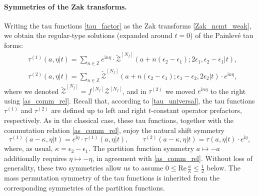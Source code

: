 \documentclass[12pt,a4paper]{article}
\numberwithin{equation}{section}
\newcommand{\ri}{\mathrm{i}}
\begin{document}
\paragraph{Symmetries of the Zak transforms.}
Writing the tau functions \eqref{tau_factor} as the Zak transforms \eqref{Zak_ncmt_weak},
we obtain the regular-type solutions (expanded around $t=0$) of the Painlev\'e tau forms: 
\begin{align}\label{Zak_tau1}
&\tau^{(1)}(a,\eta|t)=\sum_{n\in\mathbb{Z}}e^{\ri n \eta}\cdot\widetilde{\mathcal{Z}}^{[N_f]}(a+n(\epsilon_2{-}\epsilon_1);2\epsilon_1,\epsilon_2{-}\epsilon_1|t), \\ \label{Zak_tau2}
&\tau^{(2)}(a,\eta|t)=\sum_{n\in\mathbb{Z}}\widetilde{\mathcal{Z}}^{[N_f]}(a+n(\epsilon_2{-}\epsilon_1);\epsilon_1{-}\epsilon_2,2\epsilon_2|t)\cdot e^{\ri n \eta},
\end{align}
where we denoted $\widetilde{\mathcal{Z}}^{[N_f]}=f^{[N_f]}\mathcal{Z}^{[N_f]}$, and in $\tau^{(2)}$ we moved $e^{\ri n\eta}$ to the right using \eqref{as_comm_rel}. Recall that, according to \eqref{tau_universal}, the tau functions $\tau^{(1)}$ and $\tau^{(2)}$ are defined up to left and right $t$-constant operator prefactors, respectively. As in the classical case, these tau functions, together with the commutation relation \eqref{as_comm_rel}, enjoy the natural shift symmetry
\begin{equation}\label{weak_shift}
\tau^{(1)}(a-\kappa,\eta|t)=e^{\ri\eta}\cdot\tau^{(1)}(a,\eta|t),  \qquad \tau^{(2)}(a-\kappa,\eta|t)=\tau(a,\eta|t)\cdot e^{\ri\eta},
\end{equation}
where, as usual, $\kappa=\epsilon_2{-}\epsilon_1$. The partition function symmetry $a\mapsto-a$ additionally requires $\eta\mapsto-\eta$, in agreement with \eqref{as_comm_rel}.
Without loss of generality, these two symmetries allow us to assume $0\leq\mathrm{Re}\,\frac{a}{\kappa}\leq\frac12$ below. The mass permutation symmetry of the tau functions is inherited from the corresponding symmetries of the partition functions.
\end{document}

